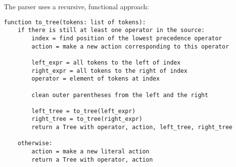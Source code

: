 \documentclass[a4paper, 11pt]{report}
\begin{document}
The parser uses a recursive, functional approach:
\begin{verbatim}
function to_tree(tokens: list of tokens):
	if there is still at least one operator in the source:
		index = find position of the lowest precedence operator
		action = make a new action corresponding to this operator
		
		left_expr = all tokens to the left of index
		right_expr = all tokens to the right of index
		operator = element of tokens at index
		
		clean outer parentheses from the left and the right
		
		left_tree = to_tree(left_expr)
		right_tree = to_tree(right_expr)
		return a Tree with operator, action, left_tree, right_tree
		
	otherwise:
		action = make a new literal action
		return a Tree with operator, action
\end{verbatim}
\end{document}

